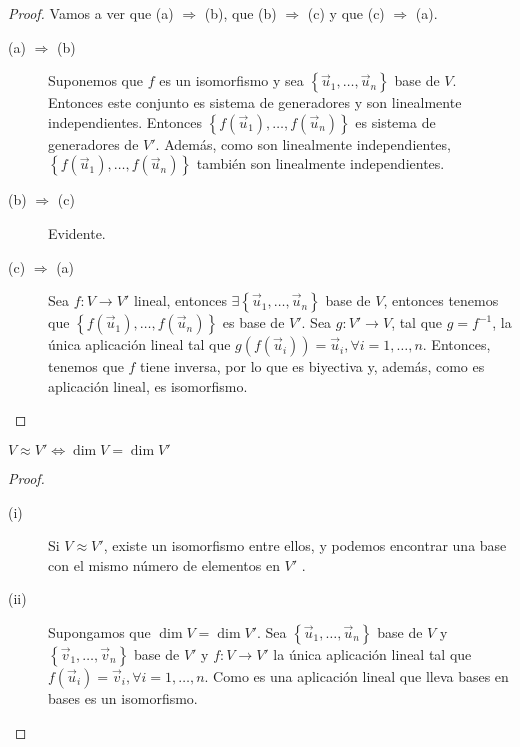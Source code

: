 \begin{proof} Vamos a ver que (a) $\displaystyle \Rightarrow $ (b), que (b) $\displaystyle \Rightarrow $ (c) y que (c) $\displaystyle \Rightarrow $ (a). 
\begin{description}
	\item[(a) $\displaystyle \Rightarrow $ (b) ] Suponemos que $\displaystyle f $ es un isomorfismo y sea $\displaystyle \left\{ \vec{u}_{1}, \ldots, \vec{u}_{n}\right\}  $ base de $\displaystyle V $. Entonces este conjunto es sistema de generadores y son linealmente independientes. Entonces $\displaystyle \left\{ f\left(\vec{u}_{1}\right), \ldots , f\left(\vec{u}_{n}\right)\right\}  $ es sistema de generadores de $\displaystyle V' $. Además, como son linealmente independientes, $\displaystyle \left\{ f\left(\vec{u}_{1}\right), \ldots, f\left(\vec{u}_{n}\right)\right\}  $ también son linealmente independientes. 
	\item[(b) $\displaystyle \Rightarrow $ (c)] Evidente.
	\item[(c) $\displaystyle \Rightarrow $ (a)] Sea $\displaystyle f : V \to V' $ lineal, entonces $\displaystyle \exists \left\{ \vec{u}_{1}, \ldots, \vec{u}_{n}\right\}  $ base de $\displaystyle V $, entonces tenemos que $\displaystyle \left\{ f\left(\vec{u}_{1}\right), \ldots, f\left(\vec{u}_{n}\right)\right\}  $ es base de $\displaystyle V' $. Sea $\displaystyle g : V' \to V $, tal que $\displaystyle g = f^{-1} $, la única aplicación lineal tal que $\displaystyle g\left(f\left(\vec{u}_{i}\right)\right) = \vec{u}_{i}, \forall i = 1, \ldots, n$. Entonces, tenemos que $\displaystyle f $ tiene inversa, por lo que es biyectiva y, además, como es aplicación lineal, es isomorfismo.
\end{description}
\end{proof}

\begin{fcolorary}[]
\normalfont $\displaystyle V \approx V' \iff \dim V = \dim V' $ 
\end{fcolorary}

\begin{proof}
\begin{description}
\item[(i)] Si $\displaystyle V \approx V' $, existe un isomorfismo entre ellos, y podemos encontrar una base con el mismo número de elementos en $\displaystyle V' $ .
\item[(ii)]  Supongamos que $\displaystyle \dim V = \dim V' $. Sea $\displaystyle \left\{ \vec{u}_{1}, \ldots, \vec{u}_{n}\right\}  $ base de $\displaystyle V $ y $\displaystyle \left\{ \vec{v}_{1}, \ldots, \vec{v}_{n}\right\}  $ base de $\displaystyle V' $ y $\displaystyle f: V \to V' $ la única aplicación lineal tal que $\displaystyle f\left(\vec{u}_{i}\right) = \vec{v}_{i}, \forall i = 1, \ldots, n $. Como es una aplicación lineal que lleva bases en bases es un isomorfismo. 
\end{description}
\end{proof}

